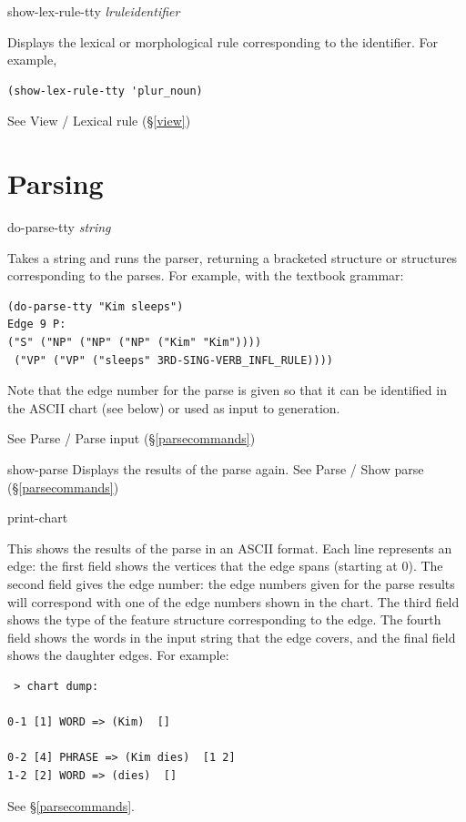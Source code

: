 \documentclass[12pt]{report}
\newcommand{\lispcommand}[1]{\noindent\rm #1}%
\newcommand{\lkbmenucommand}{{\bf}}
\begin{document}
\lispcommand{show-lex-rule-tty {\it lruleidentifier}}

Displays the lexical or
morphological rule corresponding to the identifier.
For example,
\begin{verbatim}
(show-lex-rule-tty 'plur_noun)
\end{verbatim}
See {\lkbmenucommand View} / {\lkbmenucommand Lexical rule} (\S\ref{view})

\section{Parsing}

\lispcommand{do-parse-tty {\it string}}

Takes a string and runs the parser, returning a bracketed 
structure or structures corresponding to the parses.
For example, with the textbook grammar:
\begin{verbatim}
(do-parse-tty "Kim sleeps")
Edge 9 P:
("S" ("NP" ("NP" ("NP" ("Kim" "Kim"))))
 ("VP" ("VP" ("sleeps" 3RD-SING-VERB_INFL_RULE))))
\end{verbatim}
Note that the edge number for the parse is given so that it
can be identified in the ASCII chart (see below) or used
as input to generation.

See {\lkbmenucommand Parse} / {\lkbmenucommand Parse input} (\S\ref{parsecommands})

\lispcommand{show-parse}
Displays the results of the parse again.
See {\lkbmenucommand Parse} / {\lkbmenucommand Show parse} (\S\ref{parsecommands})

\lispcommand{print-chart}

This shows the results of the parse in an ASCII format.
Each line represents an edge:
the first field shows the vertices that the
edge spans (starting at 0).  The second field
gives the edge number: the edge numbers given for the
parse results will correspond with one of the edge numbers
shown in the chart.  The third field shows the type of the
feature structure corresponding to the edge.
The fourth field shows the words in the input string that the
edge covers, and the final field shows the daughter edges.
For example:
\begin{verbatim}
 > chart dump:

0-1 [1] WORD => (Kim)  []

0-2 [4] PHRASE => (Kim dies)  [1 2]
1-2 [2] WORD => (dies)  []
\end{verbatim}

See \S\ref{parsecommands}.
\end{document}
